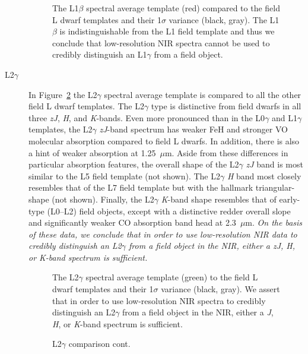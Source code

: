 \documentclass[modern]{aastex61}
\begin{document}
\begin{description}
\begin{figure}[b]
    \caption{The L1$\beta$ spectral average template (red) compared to the field L dwarf templates and their 1$\sigma$ variance (black, gray). The L1$\beta$ is indistinguishable from the L1 field template and thus we conclude that low-resolution NIR spectra cannot be used to credibly distinguish an L1$\gamma$ from a field object.}
    \label{fig:L1b-field}
\end{figure}
\clearpage

\item[L2$\gamma$]{
In Figure~\ref{fig:L2lg-field}\added{,} the L2$\gamma$ spectral average template is compared to all the other field L dwarf templates.
The L2$\gamma$ type is distinctive from field dwarfs in all three \emph{zJ}, \emph{H}, and \emph{K}-bands.
Even more pronounced than in the L0$\gamma$ and L1$\gamma$ templates, the L2$\gamma$ \emph{zJ}-band spectrum has weaker FeH and stronger VO molecular absorption compared to field L dwarfs.
In addition, there is also a hint of weaker  absorption at 1.25~$\mu$m. Aside from these differences in particular absorption features, the overall shape of the L2$\gamma$ \emph{zJ} band is most similar to the L5 field template (not shown).
The L2$\gamma$ \emph{H} band most closely resembles that of the L7 field template but with the hallmark  triangular-shape (not shown).
Finally, the L2$\gamma$ \emph{K}-band shape resembles that of early-type (L0--L2) field objects, except with a distinctive redder overall slope and significantly weaker CO absorption band head at 2.3~$\mu$m.
\emph{On the basis of these data, we conclude that in order to use low-resolution NIR data to credibly distinguish an L2$\gamma$ from a field object in the NIR, either a \emph{zJ}, \emph{H}, or \emph{K}-band spectrum is sufficient.}
}

\begin{figure}[b]
    \caption{The L2$\gamma$ spectral average template (green) to the field L dwarf templates and their 1$\sigma$ variance (black, gray).
    We assert that in order to use low-resolution NIR spectra to credibly distinguish an L2$\gamma$ from a field object in the NIR, either a \emph{J}, \emph{H}, or \emph{K}-band spectrum is sufficient.}
    \label{fig:L2lg-field}
\end{figure}

\begin{figure}
  \caption{L2$\gamma$ comparison cont.}
\end{figure}
\clearpage


\end{description}
\end{document}
